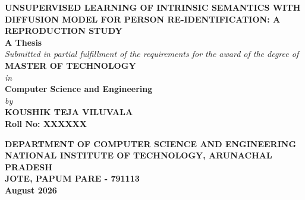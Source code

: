 \begin{titlepage}
\begin{center}
\textbf{\Large UNSUPERVISED LEARNING OF INTRINSIC SEMANTICS WITH DIFFUSION MODEL FOR PERSON RE-IDENTIFICATION: A REPRODUCTION STUDY}\\
\vspace{1cm}
\textbf{A Thesis}\\
\textit{Submitted in partial fulfillment of the requirements for the award of the degree of}\\
\vspace{0.5cm}
\textbf{MASTER OF TECHNOLOGY}\\
\textit{in}\\
\textbf{Computer Science and Engineering}\\
\vspace{1.5cm}
\textit{by}\\
\vspace{0.5cm}
\textbf{KOUSHIK TEJA VILUVALA}\\
\textbf{Roll No: XXXXXX}\\
\vspace{2cm}
\begin{figure}[H]
\centering
\end{figure}
\vspace{1cm}
\textbf{DEPARTMENT OF COMPUTER SCIENCE AND ENGINEERING}\\
\textbf{NATIONAL INSTITUTE OF TECHNOLOGY, ARUNACHAL PRADESH}\\
\textbf{JOTE, PAPUM PARE - 791113}\\
\vspace{0.5cm}
\textbf{August 2026}
\end{center}
\end{titlepage}
